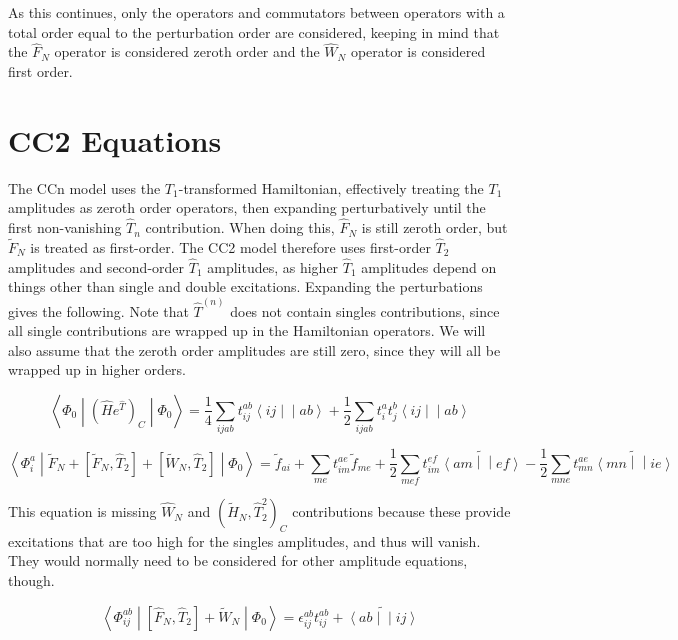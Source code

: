 \documentclass{article}
\newcommand{\tei}[2]{\left<{#1}\middle|\middle|{#2}\right>}
\begin{document}
As this continues, only the operators and commutators between operators with a total order equal to the perturbation order are considered, keeping in mind that the $\hat{F}_N$ operator is considered zeroth order and the $\hat{W}_N$ operator is considered first order.

\section{CC2 Equations}

The CCn model uses the $T_1$-transformed Hamiltonian, effectively treating the $T_1$ amplitudes as zeroth order operators, then expanding perturbatively until the first non-vanishing $\hat{T}_n$ contribution. When doing this, $\hat{F}_N$ is still zeroth order, but $\tilde{F}_N$ is treated as first-order. The CC2 model therefore uses first-order $\hat{T}_2$ amplitudes and second-order $\hat{T}_1$ amplitudes, as higher $\hat{T}_1$ amplitudes depend on things other than single and double excitations. Expanding the perturbations gives the following. Note that $\hat{T}^{(n)}$ does not contain singles contributions, since all single contributions are wrapped up in the Hamiltonian operators. We will also assume that the zeroth order amplitudes are still zero, since they will all be wrapped up in higher orders.

\begin{equation}
  \left<\Phi_0\middle|\left(\hat{H}e^{\hat{T}}\right)_C\middle|\Phi_0\right> = \frac{1}{4} \sum_{ijab}t_{ij}^{ab}\tei{ij}{ab} + \frac{1}{2}\sum_{ijab}t_i^at_j^b\tei{ij}{ab}
\end{equation}

\begin{equation}
  \left<\Phi_i^a\middle|\tilde{F}_N + \left[\tilde{F}_N, \hat{T}_2\right] + \left[\tilde{W}_N, \hat{T}_2\right]\middle|\Phi_0\right> = \tilde{f}_{ai} + \sum_{me} t_{im}^{ae}\tilde{f}_{me} + \frac{1}{2}\sum_{mef} t_{im}^{ef}\tilde{\tei{am}{ef}} - \frac{1}{2}\sum_{mne} t_{mn}^{ae}\tilde{\tei{mn}{ie}}
\end{equation}

This equation is missing $\hat{W}_N$ and $\left(\tilde{H}_N, \hat{T}_2^2\right)_C$ contributions because these provide excitations that are too high for the singles amplitudes, and thus will vanish. They would normally need to be considered for other amplitude equations, though.

\begin{equation}
  \left<\Phi_{ij}^{ab}\middle|\left[\hat{F}_N, \hat{T}_2\right] + \tilde{W}_N\middle|\Phi_0\right> = \epsilon_{ij}^{ab}t_{ij}^{ab} + \tilde{\tei{ab}{ij}}
\end{equation}
\end{document}

